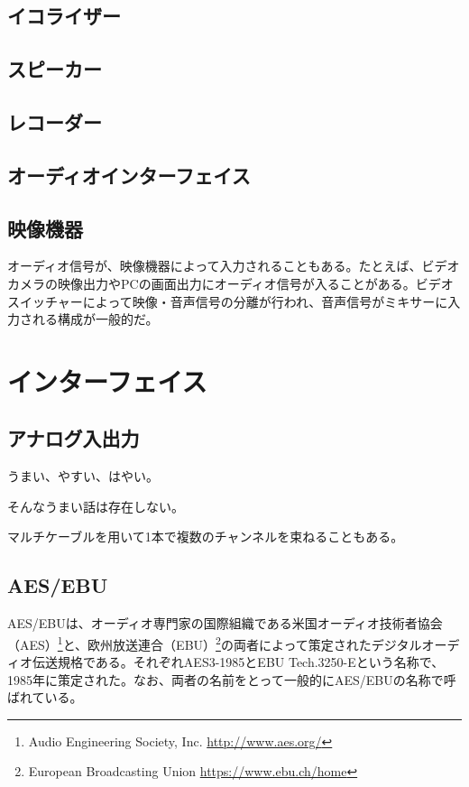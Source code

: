 \subsection{イコライザー}

\subsection{スピーカー}

\subsection{レコーダー}

\subsection{オーディオインターフェイス}

\subsection{映像機器}

オーディオ信号が、映像機器によって入力されることもある。たとえば、ビデオカメラの映像出力やPCの画面出力にオーディオ信号が入ることがある。ビデオスイッチャーによって映像・音声信号の分離が行われ、音声信号がミキサーに入力される構成が一般的だ。

\section{インターフェイス}

\subsection{アナログ入出力}

うまい、やすい、はやい。

そんなうまい話は存在しない。

マルチケーブルを用いて1本で複数のチャンネルを束ねることもある。

\subsection{AES/EBU}
\label{sec:aes/ebu}

AES/EBUは、オーディオ専門家の国際組織である米国オーディオ技術者協会（AES）\footnote{Audio Engineering Society, Inc. \url{http://www.aes.org/}}と、欧州放送連合（EBU）\footnote{European Broadcasting Union \url{https://www.ebu.ch/home}}の両者によって策定されたデジタルオーディオ伝送規格である。それぞれAES3-1985\cite{aes3-1985}とEBU Tech.3250-E\cite{ebutech-3250-e}という名称で、1985年に策定された。なお、両者の名前をとって一般的にAES/EBUの名称で呼ばれている。

